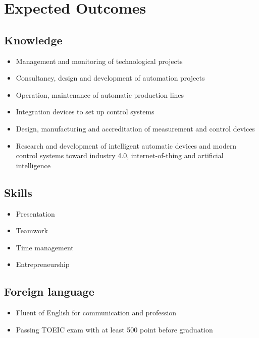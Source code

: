 \documentclass[11p]{article}
\theoremstyle{problemstyle}
\begin{document}
\section{Expected Outcomes}

\subsection{Knowledge}

\begin{itemize}
	\item Management and monitoring of technological projects
	\item Consultancy, design and development of automation projects
	\item Operation, maintenance of automatic production lines 
	\item Integration devices to set up control systems
	\item Design, manufacturing and accreditation of measurement and control devices
	\item Research and development of intelligent automatic devices and modern control systems toward industry 4.0, internet-of-thing and artificial intelligence
\end{itemize}

\subsection{Skills}

\begin{itemize}
	\item Presentation
	\item Teamwork
	\item Time management
	\item Entrepreneurship
\end{itemize}

\subsection{Foreign language}

\begin{itemize}
	\item Fluent of English for communication and profession
	\item Passing TOEIC exam with at least 500 point before graduation
\end{itemize}
\end{document}
